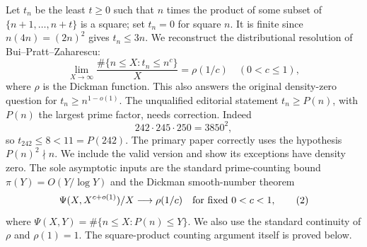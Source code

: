 Let $t_n$ be the least $t\ge0$ such that $n$ times the product of some subset of $\{n+1,\ldots,n+t\}$ is a square; set $t_n=0$ for square $n$. It is finite since $n(4n)=(2n)^2$ gives $t_n\le3n$. We reconstruct the distributional resolution of Bui--Pratt--Zaharescu:
\[
 \lim_{X\to\infty}\frac{\#\{n\le X:t_n\le n^c\}}X
 =\rho(1/c)\quad(0<c\le1),                              \tag{1}
\]
where $\rho$ is the Dickman function. This also answers the original density-zero question for $t_n\ge n^{1-o(1)}$.
The unqualified editorial statement $t_n\ge P(n)$, with $P(n)$ the largest prime factor, needs correction. Indeed
\[
 242\cdot245\cdot250=3850^2,
\]
so $t_{242}\le8<11=P(242)$. The primary paper correctly uses the hypothesis $P(n)^2\nmid n$. We include the valid version and show its exceptions have density zero.
The sole asymptotic inputs are the standard prime-counting bound $\pi(Y)=O(Y/\log Y)$ and the Dickman smooth-number theorem
\[
 \Psi(X,X^{c+o(1)})/X\longrightarrow\rho(1/c)
 \quad\hbox{for fixed }0<c<1,                            \tag{2}
\]
where $\Psi(X,Y)=\#\{n\le X:P(n)\le Y\}$. We also use the standard continuity of $\rho$ and $\rho(1)=1$. The square-product counting argument itself is proved below.
